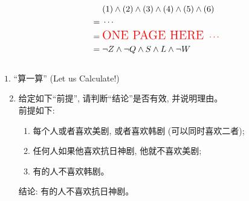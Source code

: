 \begin{frame}{}
  \setlength{\jot}{1.5ex}
  \begin{align*}
    & (1) \land (2) \land (3) \land (4) \land (5) \land (6) \\
    =\; & \cdots \\
    =\; & \textcolor{red}{\text{\Large ONE PAGE HERE } \cdots } \\
    =\; & \lnot Z \land \lnot Q \land S \land L \land \lnot W
  \end{align*}

  \pause
\end{frame}

\begin{frame}{}
  \begin{columns}
      \pause
  \end{columns}
\end{frame}

\begin{frame}{}
  \begin{exampleblock}{$1.$ ``算一算'' (Let us Calculate!)}	
    \begin{enumerate}[(1)]
      \setcounter{enumi}{1}
      \item 给定如下``前提'', 请判断``结论''是否有效, 并说明理由。\\
	前提如下:

	\begin{enumerate}[(1)]
	  \setlength{\itemsep}{6pt}
	  \item 每个人或者喜欢美剧, 或者喜欢韩剧 (可以同时喜欢二者);

	  \item 任何人如果他喜欢抗日神剧, 他就不喜欢美剧;

	  \item 有的人不喜欢韩剧。

	\end{enumerate}
	结论: 有的人不喜欢抗日神剧。 \only<3->{\qquad $\teal{\exists x: \lnot J(x)}$}
    \end{enumerate}
  \end{exampleblock}

\end{frame}

